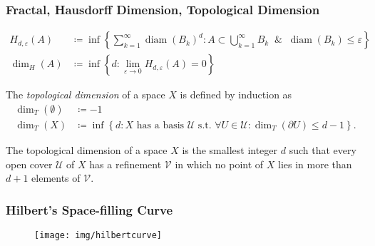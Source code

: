\documentclass[UTF8,11pt,colorlinks,compress,openany]{beamer}%
\begin{document}
\begin{frame}\frametitle{Fractal, Hausdorff Dimension, Topological Dimension}
\setlength\abovedisplayskip{0pt}
\setlength\belowdisplayskip{0pt}
\begin{center}
\end{center}
\begin{align*}
H_{d,\varepsilon}(A)&\coloneqq \inf\left\{\sum_{k=1}^\infty\operatorname{diam}(B_k)^d: A\subset\bigcup_{k=1}^\infty B_k\;\;\&\;\;\operatorname{diam}(B_k)\leq\varepsilon\right\}\\
\dim_H(A)&\coloneqq \inf\left\{d:\lim_{\varepsilon\to 0} H_{d,\varepsilon}(A)=0\right\}
\end{align*}
\begin{definition}
The \emph{topological dimension} of a space $X$ is defined by induction as
\begin{align*}
\dim_T(\emptyset)&\coloneqq -1\\
\dim_T(X)&\coloneqq \inf\left\{d: X \textrm{ has a basis } \mathcal{U} \textrm{ s.t. } \forall U\in\mathcal{U}: \dim_T(\partial U)\leq d-1\right\}.
\end{align*}
\end{definition}
The topological dimension of a space $X$ is the smallest integer $d$ such that every open cover $\mathcal{U}$ of $X$ has a refinement $\mathcal{V}$ in which no point of $X$ lies in more than $d+1$ elements of $\mathcal{V}$.
\end{frame}

\begin{frame}\frametitle{Hilbert's Space-filling Curve}
	\begin{figure}
		\texttt{[image: img/hilbertcurve]}
	\end{figure}
	\begin{figure}
	\end{figure}
\end{frame}
\end{document}
